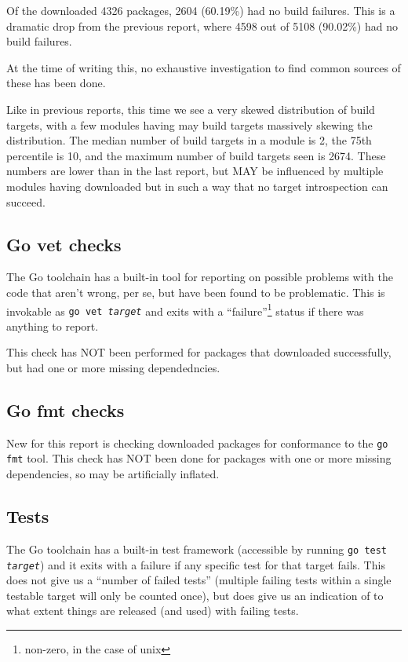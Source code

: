 \documentclass[a4paper]{paper}
\begin{document}
Of the downloaded 4326 packages, 2604 (60.19\%) had no build
failures. This is a dramatic drop from the previous report, where 4598
out of 5108 (90.02\%) had no build failures.

At the time of writing this, no exhaustive investigation to find common
sources of these has been done.

Like in previous reports, this time we see a very skewed distribution
of build targets, with a few modules having may build targets
massively skewing the distribution. The median number of build targets
in a module is 2, the 75th percentile is 10, and the maximum number of
build targets seen is 2674. These numbers are lower than in the last
report, but MAY be influenced by multiple modules having downloaded
but in such a way that no target introspection can succeed.

\subsection{Go vet checks}

The Go toolchain has a built-in tool for reporting on possible
problems with the code that aren't wrong, per se, but have been found
to be problematic. This is invokable as {\tt go vet {\it target}}
and exits with a ``failure''\footnote{non-zero, in the case of unix}
status if there was anything to report.

This check has NOT been performed for packages that downloaded
successfully, but had one or more missing dependedncies.

\subsection{Go fmt checks}

New for this report is checking downloaded packages for conformance to
the {\tt go fmt} tool. This check has NOT been done for packages with
one or more missing dependencies, so may be artificially inflated.


\subsection{Tests}

The Go toolchain has a built-in test framework (accessible by running
{\tt go test {\it target}}) and it exits with a failure if any
specific test for that target fails. This does not give us a ``number
of failed tests'' (multiple failing tests within a single testable
target will only be counted once), but does give us an indication of
to what extent things are released (and used) with failing tests.
\end{document}
